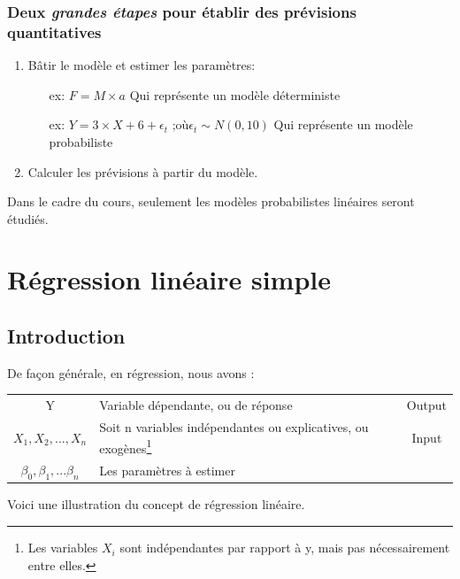 \documentclass[11pt,french]{report}
\begin{document}
\subsection*{Deux \textit{grandes étapes} pour établir des prévisions quantitatives}
\begin{enumerate}
\item Bâtir le modèle et estimer les paramètres:
\begin{itemize}
\item[ex:] $F = M \times a$ Qui représente un modèle déterministe
\item[ex:] $Y =3 \times X + 6 + \epsilon_t \text{ ;où} \epsilon_t \sim N(0, 10)$ Qui représente un modèle probabiliste 
\end{itemize}
\item Calculer les prévisions à partir du modèle.
\end{enumerate}

\bigskip
Dans le cadre du cours, seulement les modèles probabilistes linéaires seront étudiés. 

\chapter{Régression linéaire simple}
\label{chap:2}
\section{Introduction}

De façon générale, en régression, nous avons :

\begin{tabularx}{\linewidth}{c|X|c}
\hline
Y & Variable dépendante, ou de réponse & Output \\
$X_1, X_2, ..., X_n$ & Soit n variables indépendantes ou explicatives, ou exogènes\footnote{Les variables $X_i$ sont indépendantes par rapport à y, mais pas nécessairement entre elles.} & Input \\
$\beta_0, \beta_1, ... \beta_n$ & Les paramètres à estimer & \\
\hline
\end{tabularx}

\bigskip
\bigskip
Voici une illustration du concept de régression linéaire.
\bigskip
\end{document}
